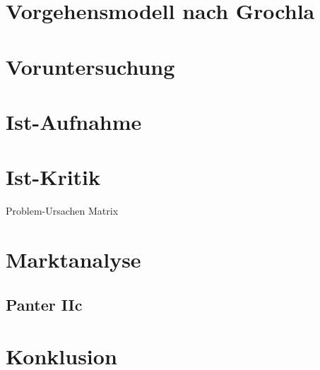 \section{Vorgehensmodell nach Grochla}


\section{Voruntersuchung}


\section{Ist-Aufnahme}


\section{Ist-Kritik}
Problem-Ursachen Matrix

\section{Marktanalyse}
\subsection{Panter IIc}

\section{Konklusion}
